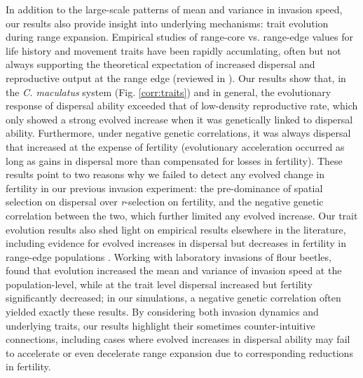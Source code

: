 \documentclass[11pt]{article}
\begin{document}
In addition to the large-scale patterns of mean and variance in invasion speed, our results also provide insight into underlying mechanisms: trait evolution during range expansion.
Empirical studies of range-core vs. range-edge values for life history and movement traits have been rapidly accumlating, often but not always supporting the theoretical expectation of increased dispersal and reproductive output at the range edge (reviewed in \citealt{chuang_expanding_2016}).
Our results show that, in the \textit{C. maculatus} system (Fig. \ref{corr:traits}) and in general, the evolutionary response of dispersal ability exceeded that of low-density reproductive rate, which only showed a strong evolved increase when it was genetically linked to dispersal ability.
Furthermore, under negative genetic correlations, it was always dispersal that increased at the expense of fertility (evolutionary acceleration occurred as long as gains in dispersal more than compensated for losses in fertility).
These results point to two reasons why we failed to detect any evolved change in fertility in our previous invasion experiment: the pre-dominance of spatial selection on dispersal over \textit{r}-selection on fertility, and the negative genetic correlation between the two, which further limited any evolved increase.
Our trait evolution results also shed light on empirical results elsewhere in the literature, including evidence for evolved increases in dispersal but decreases in fertility in range-edge populations \citep{simmons_changes_2004,hughes_evolutionary_2003}.
Working with laboratory invasions of flour beetles, \cite{weiss-lehman_rapid_2017} found that evolution increased the mean and variance of invasion speed at the population-level, while at the trait level dispersal increased but fertility significantly decreased; in our simulations, a negative genetic correlation often yielded exactly these results. 
By considering both invasion dynamics and underlying traits, our results highlight their sometimes counter-intuitive connections, including cases where evolved increases in dispersal ability may fail to accelerate or even decelerate range expansion due to corresponding reductions in fertility.
\end{document}
